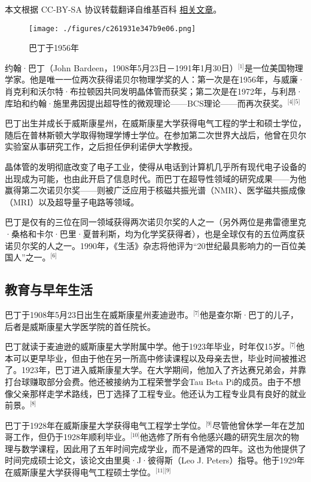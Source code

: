 
本文根据 CC-BY-SA 协议转载翻译自维基百科 \href{https://en.wikipedia.org/wiki/John_Bardeen}{相关文章}。

\begin{figure}[ht]
\centering
\texttt{[image: ./figures/c261931e347b9e06.png]}
\caption{巴丁于1956年} \label{fig_Yhbd_1}
\end{figure}
约翰·巴丁（John Bardeen，1908年5月23日－1991年1月30日）\(^\text{[1]}\)是一位美国物理学家。他是唯一一位两次获得诺贝尔物理学奖的人：第一次是在1956年，与威廉·肖克利和沃尔特·布拉顿因共同发明晶体管而获奖；第二次是在1972年，与利昂·库珀和约翰·施里弗因提出超导性的微观理论——BCS理论——而再次获奖。\(^\text{[4][5]}\)

巴丁出生并成长于威斯康星州，在威斯康星大学获得电气工程的学士和硕士学位，随后在普林斯顿大学取得物理学博士学位。在参加第二次世界大战后，他曾在贝尔实验室从事研究工作，之后担任伊利诺伊大学教授。

晶体管的发明彻底改变了电子工业，使得从电话到计算机几乎所有现代电子设备的出现成为可能，也由此开启了信息时代。而巴丁在超导性领域的研究成果——为他赢得第二次诺贝尔奖——则被广泛应用于核磁共振光谱（NMR）、医学磁共振成像（MRI）以及超导量子电路等领域。

巴丁是仅有的三位在同一领域获得两次诺贝尔奖的人之一（另外两位是弗雷德里克·桑格和卡尔·巴里·夏普利斯，均为化学奖获得者），也是全球仅有的五位两度获诺贝尔奖的人之一。1990年，《生活》杂志将他评为“20世纪最具影响力的一百位美国人”之一。\(^\text{[6]}\)
\subsection{教育与早年生活}
巴丁于1908年5月23日出生在威斯康星州麦迪逊市。\(^\text{[7]}\)他是查尔斯·巴丁的儿子，后者是威斯康星大学医学院的首任院长。

巴丁就读于麦迪逊的威斯康星大学附属中学。他于1923年毕业，时年仅15岁。\(^\text{[7]}\)他本可以更早毕业，但由于他在另一所高中修读课程以及母亲去世，毕业时间被推迟了。1923年，巴丁进入威斯康星大学。在大学期间，他加入了齐达赛兄弟会，并靠打台球赚取部分会费。他还被接纳为工程荣誉学会Tau Beta Pi的成员。由于不想像父亲那样走学术路线，巴丁选择了工程专业。他还认为工程专业具有良好的就业前景。\(^\text{[8]}\)

巴丁于1928年在威斯康星大学获得电气工程学士学位。\(^\text{[9]}\)尽管他曾休学一年在芝加哥工作，但仍于1928年顺利毕业。\(^\text{[10]}\)他选修了所有令他感兴趣的研究生层次的物理与数学课程，因此用了五年时间完成学业，而不是通常的四年。这也为他提供了时间完成硕士论文，该论文由里奥·J·彼得斯（Leo J. Peters）指导。他于1929年在威斯康星大学获得电气工程硕士学位。\(^\text{[11][9]}\)

